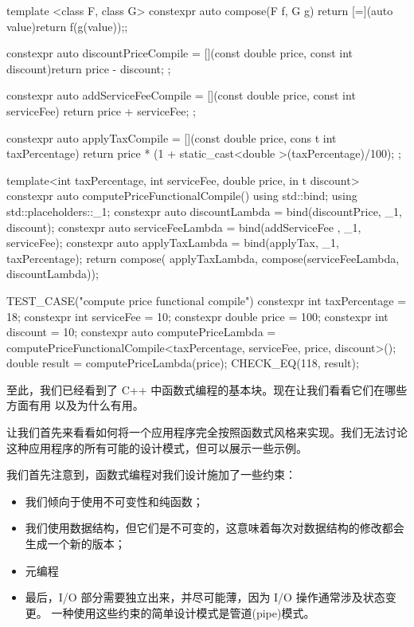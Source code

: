 \begin{cpp}
template <class F, class G>
constexpr auto compose(F f, G g){
  return [=](auto value){return f(g(value));};
}

constexpr auto discountPriceCompile = 
[](const double price, const
int discount){return price - discount;
};

constexpr auto addServiceFeeCompile = 
[](const double price, const
int serviceFee){ 
  return price + serviceFee; 
};

constexpr auto applyTaxCompile = 
[](const double price,
cons t int taxPercentage){ 
  return price * (1 + static_cast<double >(taxPercentage)/100); 
};

template<int taxPercentage, int serviceFee, double price, in t
discount>
constexpr auto computePriceFunctionalCompile() {
  using std::bind;
  using std::placeholders::_1;
  constexpr auto discountLambda = bind(discountPrice, _1, discount);
  constexpr auto serviceFeeLambda = bind(addServiceFee , _1, serviceFee);
  constexpr auto applyTaxLambda = bind(applyTax, _1, taxPercentage);
  return compose( applyTaxLambda, compose(serviceFeeLambda, discountLambda));
}

TEST_CASE("compute price functional compile"){
  constexpr int taxPercentage = 18;
  constexpr int serviceFee = 10;
  constexpr double price = 100;
  constexpr int discount = 10;
  constexpr auto computePriceLambda =
  computePriceFunctionalCompile<taxPercentage, serviceFee, price,
  discount>();
  double result = computePriceLambda(price);
  CHECK_EQ(118, result);
}
\end{cpp}

至此，我们已经看到了 C++ 中函数式编程的基本块。现在让我们看看它们在哪些方面有用
以及为什么有用。


让我们首先来看看如何将一个应用程序完全按照函数式风格来实现。我们无法讨论这种应用程序的所有可能的设计模式，但可以展示一些示例。

我们首先注意到，函数式编程对我们设计施加了一些约束：

\begin{itemize}
\item 
我们倾向于使用不可变性和纯函数；

\item 
我们使用数据结构，但它们是不可变的，这意味着每次对数据结构的修改都会生成一个新的版本；

\item 
元编程

\item 
最后，I/O 部分需要独立出来，并尽可能薄，因为 I/O 操作通常涉及状态变更。
一种使用这些约束的简单设计模式是管道(pipe)模式。
\end{itemize}

